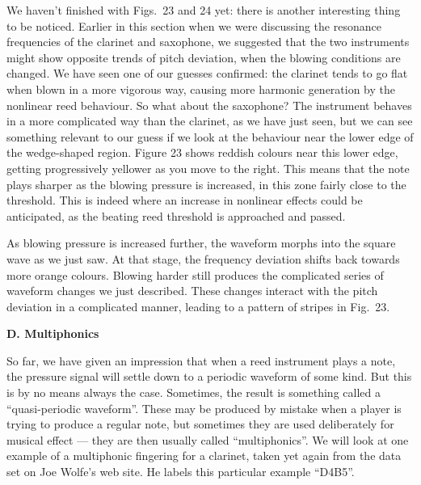 
  We haven’t finished with Figs.\ 23 and 24 yet: there is another interesting 
  thing to be noticed. Earlier in this section when we were discussing the 
  resonance frequencies of the clarinet and saxophone, we suggested that the 
  two instruments might show opposite trends of pitch deviation, when the 
  blowing conditions are changed. We have seen one of our guesses confirmed: 
  the clarinet tends to go flat when blown in a more vigorous way, causing more 
  harmonic generation by the nonlinear reed behaviour. So what about the 
  saxophone? The instrument behaves in a more complicated way than the 
  clarinet, as we have just seen, but we can see something relevant to our 
  guess if we look at the behaviour near the lower edge of the wedge-shaped 
  region. Figure 23 shows reddish colours near this lower edge, getting 
  progressively yellower as you move to the right. This means that the note 
  plays sharper as the blowing pressure is increased, in this zone fairly close 
  to the threshold. This is indeed where an increase in nonlinear effects could 
  be anticipated, as the beating reed threshold is approached and passed. 

  As blowing pressure is increased further, the waveform morphs into the square 
  wave as we just saw. At that stage, the frequency deviation shifts back 
  towards more orange colours. Blowing harder still produces the complicated 
  series of waveform changes we just described. These changes interact with the 
  pitch deviation in a complicated manner, leading to a pattern of stripes in 
  Fig.\ 23. 

  \textbf{D. Multiphonics} 

  So far, we have given an impression that when a reed instrument plays a note, 
  the pressure signal will settle down to a periodic waveform of some kind. But 
  this is by no means always the case. Sometimes, the result is something 
  called a “quasi-periodic waveform”. These may be produced by mistake when a 
  player is trying to produce a regular note, but sometimes they are used 
  deliberately for musical effect — they are then usually called 
  “multiphonics”. We will look at one example of a multiphonic fingering for a 
  clarinet, taken yet again from the data set on Joe Wolfe’s web site. He 
  labels this particular example “D4B5”. 

